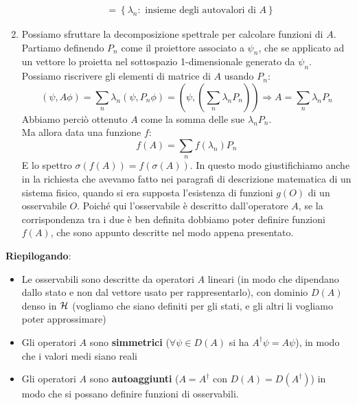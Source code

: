 \begin{enumerate}
\begin{align*}
	    &=\left\{\lambda_n:\text{ insieme degli autovalori di } A\right\}
	\end{align*}
\item Possiamo sfruttare la decomposizione spettrale per calcolare funzioni di $A$.\\
Partiamo definendo $P_n$ come il proiettore associato a $\psi_n$, che se applicato ad un vettore lo proietta nel sottospazio 1-dimensionale generato da $\psi_n$. Possiamo riscrivere gli elementi di matrice di $A$ usando $P_n$:
	\[
	\left(\psi, A\phi\right)=\sum_{n}{\lambda_n\left(\psi,P_n\phi\right)}=\left(\psi, \left(\sum_{n}{\lambda_n P_n}\right)\right) \Rightarrow A=\sum_{n}{\lambda_n P_n}
	\]
	Abbiamo perciò ottenuto $A$ come la somma delle sue  $\lambda_n P_n$.\\
	Ma allora data una funzione $f$:
	\begin{equation}
	f\left(A\right)=\sum_{n}{f\left(\lambda_n\right)P_n}
	\label{eqn:funzioniop}
	\end{equation}
	E lo spettro $\sigma \left(f\left(A\right)\right)=f(\sigma \left(A\right))$. 
	In questo modo giustifichiamo anche in \MQ la richiesta che avevamo fatto nei paragrafi di descrizione matematica di un sistema fisico, quando si era supposta l'esistenza di funzioni $g(O)$ di un osservabile $O$. Poiché qui l'osservabile è descritto dall'operatore $A$, se la corrispondenza tra i due è ben definita dobbiamo poter definire funzioni $f(A)$, che sono appunto descritte nel modo appena presentato.
\end{enumerate}

\textbf{Riepilogando}:
\begin{itemize}
    \item Le osservabili sono descritte da operatori $A$ lineari (in modo che dipendano dallo stato e non dal vettore usato per rappresentarlo), con dominio $D(A)$ denso in $\mathcal{H}$ (vogliamo che siano definiti per  gli stati, e gli altri li vogliamo poter approssimare) %
    \item Gli operatori $A$ sono \textbf{simmetrici} ($\forall \psi \in D(A)$ si ha $A^\dag \psi = A\psi$), in modo che i valori medi siano reali
    \item Gli operatori $A$ sono \textbf{autoaggiunti} ($A = A^\dag$ con $D(A) = D(A^\dag)$) in modo che si possano definire funzioni di osservabili.
\end{itemize}

